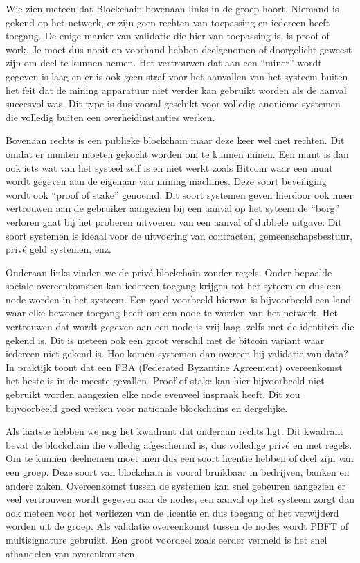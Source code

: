 Wie zien meteen dat Blockchain bovenaan links in de groep hoort. Niemand is gekend op het netwerk, er zijn geen rechten van toepassing en iedereen heeft toegang. De enige manier van validatie die hier van toepassing is, is proof-of-work. Je moet dus nooit op voorhand hebben deelgenomen of doorgelicht geweest zijn om deel te kunnen nemen. Het vertrouwen dat aan een ``miner'' wordt gegeven is laag en er is ook geen straf voor het aanvallen van het systeem buiten het feit dat de mining apparatuur niet verder kan gebruikt worden als de aanval succesvol was. Dit type is dus vooral geschikt voor volledig anonieme systemen die volledig buiten een overheidinstanties werken. 

Bovenaan rechts is een publieke blockchain maar deze keer wel met rechten. Dit omdat er munten moeten gekocht worden om te kunnen minen. Een munt is dan ook iets wat van het systeel zelf is en niet werkt zoals Bitcoin waar een munt wordt gegeven aan de eigenaar van mining machines. Deze soort beveiliging wordt ook ``proof of stake'' genoemd. Dit soort systemen geven hierdoor ook meer vertrouwen aan de gebruiker aangezien bij een aanval op het syteem de ``borg'' verloren gaat bij het proberen uitvoeren van een aanval of dubbele uitgave. Dit soort systemen is ideaal voor de uitvoering van contracten, gemeenschapsbestuur, privé geld systemen, enz. 

Onderaan links vinden we de privé blockchain zonder regels. Onder bepaalde sociale overeenkomsten kan iedereen toegang krijgen tot het syteem en dus een node worden in het systeem. Een goed voorbeeld hiervan is bijvoorbeeld een land waar elke bewoner toegang heeft om een node te worden van het netwerk. Het vertrouwen dat wordt gegeven aan een node is vrij laag, zelfs met de identiteit die gekend is. Dit is meteen ook een groot verschil met de bitcoin variant waar iedereen niet gekend is. Hoe komen systemen dan overeen bij validatie van data? In praktijk toont dat een FBA (Federated Byzantine Agreement) overeenkomst het beste is in de meeste gevallen. Proof of stake kan hier bijvoorbeeld niet gebruikt worden aangezien elke node evenveel inspraak heeft. Dit zou bijvoorbeeld goed werken voor nationale blockchains en dergelijke. 

Als laatste hebben we nog het kwadrant dat onderaan rechts ligt. Dit kwadrant bevat de blockchain die volledig afgeschermd is, dus volledige privé en met regels. Om te kunnen deelnemen moet men dus een soort licentie hebben of deel zijn van een groep. Deze soort van blockchain is vooral bruikbaar in bedrijven, banken en andere zaken. Overeenkomst tussen de systemen kan snel gebeuren aangezien er veel vertrouwen wordt gegeven aan de nodes, een aanval op het systeem zorgt dan ook meteen voor het verliezen van de licentie en dus toegang of het verwijderd worden uit de groep. Als validatie overeenkomst tussen de nodes wordt PBFT of multisignature gebruikt. Een groot voordeel zoals eerder vermeld is het snel afhandelen van overenkomsten. 

